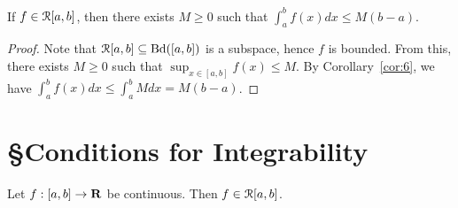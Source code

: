 \documentclass[10pt,twoside,openany]{memoir}
\begin{document}
    \begin{corollary}
        If $f \in \mathcal{R}[a,b]$, then there exists $M \geq 0$ such that $\int_a^b f(x)dx \leq M(b-a)$.
    \end{corollary}
        \begin{proof}
            Note that $\mathcal{R}[a,b] \subseteq \operatorname{Bd}([a,b])$ is a subspace, hence $f$ is bounded. From this, there exists $M \geq 0$ such that $\sup_{x \in [a,b]}f(x) \leq M$. By Corollary~\ref{cor:6}, we have $\int_a^bf(x)dx \leq \int_a^b M dx = M(b-a)$. 
        \end{proof}

\section*{\S\:\:Conditions for Integrability}
    \begin{theorem}\label{thm:cont-implies-inte}
        Let $f:[a,b]\rightarrow \mathbf{R}$ be continuous. Then $f \in \mathcal{R}[a,b]$.
    \end{theorem}
\end{document}
